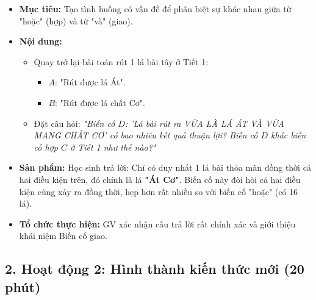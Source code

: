 \documentclass[12pt, a4paper]{article}
\begin{document}
\begin{itemize}[leftmargin=1.2cm]
    \item[a)] \textbf{Mục tiêu:} Tạo tình huống có vấn đề để phân biệt sự khác nhau giữa từ "hoặc" (hợp) và từ "và" (giao).
    \item[b)] \textbf{Nội dung:}
    \begin{itemize}[leftmargin=0.6cm]
        \item Quay trở lại bài toán rút 1 lá bài tây ở Tiết 1:
        \begin{itemize}
            \item $A$: "Rút được lá Át".
            \item $B$: "Rút được lá chất Cơ".
        \end{itemize}
        \item Đặt câu hỏi: \textit{"Biến cố $D$: 'Lá bài rút ra VỪA LÀ LÁ ÁT VÀ VỪA MANG CHẤT CƠ' có bao nhiêu kết quả thuận lợi? Biến cố $D$ khác biến cố hợp $C$ ở Tiết 1 như thế nào?"}
    \end{itemize}

    \item[c)] \textbf{Sản phẩm:} Học sinh trả lời: Chỉ có duy nhất 1 lá bài thỏa mãn đồng thời cả hai điều kiện trên, đó chính là lá \textbf{"Át Cơ"}. Biến cố này đòi hỏi cả hai điều kiện cùng xảy ra đồng thời, hẹp hơn rất nhiều so với biến cố "hoặc" (có 16 lá).
    \item[d)] \textbf{Tổ chức thực hiện:} GV xác nhận câu trả lời rất chính xác và giới thiệu khái niệm Biến cố giao.
\end{itemize}

\subsection*{2. Hoạt động 2: Hình thành kiến thức mới (20 phút)}
\end{document}
